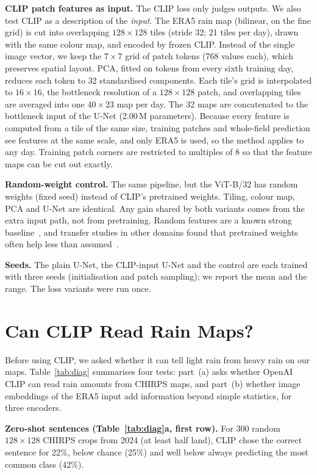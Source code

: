 \documentclass[sigconf]{acmart}
\begin{document}
\textbf{CLIP patch features as input.} The CLIP loss only judges outputs.
We also test CLIP as a description of the \emph{input}. The ERA5 rain map
(bilinear, on the fine grid) is cut into overlapping $128\times128$ tiles
(stride 32; 21 tiles per day), drawn with the same colour map, and encoded
by frozen CLIP. Instead of the single image vector, we keep the $7\times7$
grid of patch tokens (768 values each), which preserves spatial layout.
PCA, fitted on tokens from every sixth training day, reduces each token to
32 standardised components. Each tile's grid is interpolated to
$16\times16$, the bottleneck resolution of a $128\times128$ patch, and
overlapping tiles are averaged into one $40\times23$ map per day. The 32
maps are concatenated to the bottleneck input of the U-Net (2.00\,M
parameters). Because every feature is computed from a tile of the same
size, training patches and whole-field prediction see features at the same
scale, and only ERA5 is used, so the method applies to any day. Training
patch corners are restricted to multiples of 8 so that the feature maps can
be cut out exactly.

\textbf{Random-weight control.} The same pipeline, but the ViT-B/32 has
random weights (fixed seed) instead of CLIP's pretrained weights. Tiling,
colour map, PCA and U-Net are identical. Any gain shared by both variants
comes from the extra input path, not from pretraining. Random features are
a known strong baseline~\cite{rahimi2007random}, and transfer studies in
other domains found that pretrained weights often help less than
assumed~\cite{raghu2019transfusion}.

\textbf{Seeds.} The plain U-Net, the CLIP-input U-Net and the control are
each trained with three seeds (initialisation and patch sampling); we
report the mean and the range. The loss variants were run once.

\section{Can CLIP Read Rain Maps?}

Before using CLIP, we asked whether it can tell light rain from heavy
rain on our maps. Table~\ref{tab:diag} summarises four tests: part~(a)
asks whether OpenAI CLIP can read rain amounts from CHIRPS maps, and
part~(b) whether image embeddings of the ERA5 input add information
beyond simple statistics, for three encoders.

\textbf{Zero-shot sentences (Table~\ref{tab:diag}a, first row).} For 300 random $128\times128$ CHIRPS crops
from 2024 (at least half land), CLIP chose the correct sentence for 22\%,
below chance (25\%) and well below always predicting the most common class
(42\%).
\end{document}
